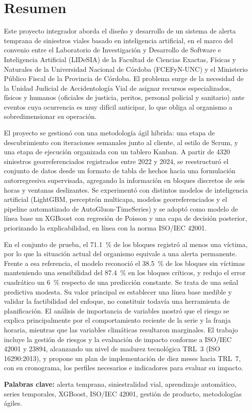 \chapter*{Resumen}

Este proyecto integrador aborda el diseño y desarrollo de un sistema de alerta temprana de siniestros viales basado en inteligencia artificial, en el marco del convenio entre el Laboratorio de Investigación y Desarrollo de Software e Inteligencia Artificial (LIDeSIA) de la Facultad de Ciencias Exactas, Físicas y Naturales de la Universidad Nacional de Córdoba (FCEFyN-UNC) y el Ministerio Público Fiscal de la Provincia de Córdoba. El problema surge de la necesidad de la Unidad Judicial de Accidentología Vial de asignar recursos especializados, físicos y humanos (oficiales de justicia, peritos, personal policial y sanitario) ante eventos cuya ocurrencia es muy difícil anticipar, lo que obliga al organismo a sobredimensionar su operación.

El proyecto se gestionó con una metodología ágil híbrida: una etapa de descubrimiento con iteraciones semanales junto al cliente, al estilo de Scrum, y una etapa de ejecución organizada con un tablero Kanban. A partir de 4320 siniestros georreferenciados registrados entre 2022 y 2024, se reestructuró el conjunto de datos desde un formato de tabla de hechos hacia una formulación autorregresiva supervisada, agregando la información en bloques discretos de seis horas y ventanas deslizantes. Se experimentó con distintos modelos de inteligencia artificial (LightGBM, perceptrón multicapa, modelos georreferenciados y el pipeline automatizado de AutoGluon-TimeSeries) y se adoptó como modelo de línea base un XGBoost con regresión de Poisson y una capa de decisión posterior, priorizando la explicabilidad, en línea con la norma ISO/IEC 42001.

En el conjunto de prueba, el \qty{71.1}{\percent} de los bloques registró al menos una víctima, por lo que la situación actual del organismo equivale a una alerta permanente. Frente a esa referencia, el modelo reconoció el \qty{38.5}{\percent} de los bloques sin víctimas manteniendo una sensibilidad del \qty{87.4}{\percent} en los bloques críticos, y redujo el error cuadrático un \qty{6}{\percent} respecto de una predicción constante. Se trata de una señal predictiva modesta. Su valor principal es establecer una línea base medible y validar la factibilidad del enfoque, no constituir todavía una herramienta de planificación. El análisis de importancia de variables mostró que el riesgo se explica principalmente por el comportamiento reciente de la serie y la franja horaria, mientras que las variables climáticas resultaron marginales. El trabajo incluye la gestión de riesgos y la evaluación de impacto conforme a ISO/IEC 42001 y 23894, alcanzando un nivel de madurez tecnológica TRL~3 (ISO 16290:2013), y propone un plan de implementación de diez meses hacia TRL~7, con su cronograma, los perfiles necesarios e indicadores para evaluar su impacto.

\medskip
\noindent\textbf{Palabras clave:} alerta temprana, siniestralidad vial, aprendizaje automático, series temporales, XGBoost, ISO/IEC 42001, gestión de producto, metodologías ágiles.
